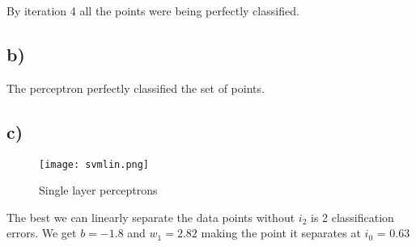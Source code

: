By iteration 4 all the points were being perfectly classified.

\clearpage
\subsection*{b)}
The perceptron perfectly classified the set of points.

\subsection*{c)}

\begin{figure}[H]
\caption{Single layer perceptrons}
\texttt{[image: svmlin.png]}
\centering
\end{figure}

The best we can linearly separate the data points without $i_2$ is 2 classification errors. 
We get $b = -1.8$ and $w_1 = 2.82$ making the point it separates at $i_0$ = 0.63 